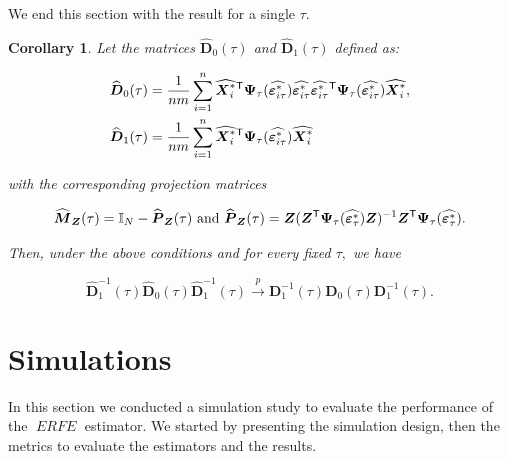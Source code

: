 \documentclass[15pt,a4paper]{article}
\newcommand{\transpose}{{}^{\text{\sffamily T}}}
\DeclareMathOperator{\ERFE}{\textit{ERFE}}
\newtheorem{corollary}{Corollary}%
\begin{document}
We end this section with the result for a single \(\tau.\)

\begin{corollary}\label{cor1_erfe}
Let the matrices $\widehat{\boldsymbol{D}}_0(\tau)$ and $\widehat{\boldsymbol{D}}_1(\tau)$ defined as:

\begin{align*}
    \begin{split}
{}& \widehat{\boldsymbol{D}}_0(\tau)= \frac{1}{nm}\sum_{i=1}^{n}\widehat{\boldsymbol{X}_{i}^{*}}\transpose\boldsymbol{\Psi}_{\tau}(\widehat{\boldsymbol{\varepsilon}_{i\tau}^{*}})\widehat{\boldsymbol{\varepsilon}_{i\tau}^{*}}\widehat{\boldsymbol{\varepsilon}_{i\tau}^{*}}\transpose
\boldsymbol{\Psi}_{\tau}(\widehat{\boldsymbol{\varepsilon}_{i\tau}^{*}})\widehat{\boldsymbol{X}_{i}^{*}},\\
{}& \widehat{\boldsymbol{D}}_1(\tau)=\frac{1}{nm}\sum_{i=1}^{n}\widehat{\boldsymbol{X}_{i}^{*}}\transpose\boldsymbol{\Psi}_{\tau}
(\widehat{\boldsymbol{\varepsilon}_{i\tau}^{*}})\widehat{\boldsymbol{X}_{i}^{*}}
    \end{split}
\end{align*}

with the corresponding projection matrices

\begin{equation*}
\widehat{\boldsymbol{M}}_{\boldsymbol{Z}}(\tau)=\mathbb{I}_{N}-\widehat{\boldsymbol{P}}_{\boldsymbol{Z}}(\tau) \mbox{ and }
\widehat{\boldsymbol{P}}_{\boldsymbol{Z}}(\tau)=\boldsymbol{Z}(\boldsymbol{Z}\transpose
\boldsymbol{\Psi}_{\tau}(\widehat{\boldsymbol{\varepsilon}_{\tau}^{*}})\boldsymbol{Z})^{-1}\boldsymbol{Z}\transpose\boldsymbol{\Psi}_{\tau}(
\widehat{\boldsymbol{\varepsilon}_{\tau}^{*}}).
\end{equation*}

Then, under the above conditions and for every fixed $\tau,$ we have

\begin{equation*}
  \widehat{\boldsymbol{D}}_1^{-1}(\tau) \widehat{\boldsymbol{D}}_0(\tau) \widehat{\boldsymbol{D}}_1^{-1}(\tau)
  \xrightarrow{p} 
  \boldsymbol{D}_1^{-1}(\tau) \boldsymbol{D}_0(\tau)\boldsymbol{D}_1^{-1}(\tau).
\end{equation*}

\end{corollary}

\section{Simulations}\label{simulation_erfe}
In this section we conducted a simulation study to evaluate the performance of the $\ERFE$ estimator. We started by presenting the simulation design, then the metrics to evaluate the estimators and the results.
\end{document}
